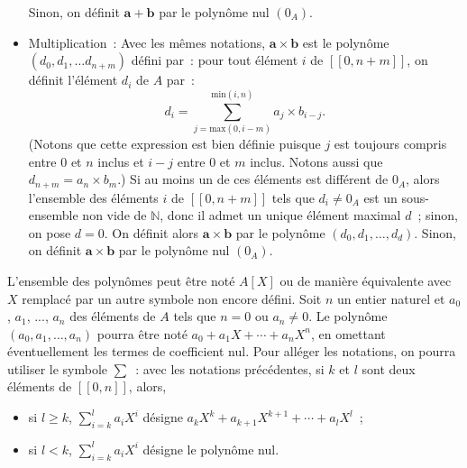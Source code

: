 \begin{itemize}[nosep]
            Sinon, on définit $\mathbf{a} + \mathbf{b}$ par le polynôme nul $(0_A)$.
        \item Multiplication : Avec les mêmes notations, $\mathbf{a} \times \mathbf{b}$ est le polynôme $(d_0, d_1, \dots d_{n+m})$ défini par : pour tout élément $i$ de $[\![0, n+m]\!]$, on définit l'élément $d_i$ de $A$ par :
            \begin{equation*}
                d_i = \sum_{j=\mathrm{max}(0,i-m)}^{\mathrm{min}(i,n)} a_j \times b_{i-j}.
            \end{equation*}
            (Notons que cette expression est bien définie puisque $j$ est toujours compris entre $0$ et $n$ inclus et $i-j$ entre $0$ et $m$ inclus.
            Notons aussi que $d_{n+m} = a_n \times b_m$.)
            Si au moins un de ces éléments est différent de $0_A$, alors l'ensemble des éléments $i$ de $[\![0, n+m]\!]$ tels que $d_i \neq 0_A$ est un sous-ensemble non vide de $\mathbb{N}$, donc il admet un unique élément maximal $d$ ; sinon, on pose $d = 0$.
            On définit alors $\mathbf{a} \times \mathbf{b}$ par le polynôme $(d_0, d_1, \dots, d_d)$.
            Sinon, on définit $\mathbf{a} \times \mathbf{b}$ par le polynôme nul $(0_A)$.
    \end{itemize}
    L'ensemble des polynômes peut être noté $A[X]$ ou de manière équivalente avec $X$ remplacé par un autre symbole non encore défini. 
    Soit $n$ un entier naturel et $a_0$, $a_1$, ..., $a_n$ des éléments de $A$ tels que $n = 0$ ou $a_n \neq 0$.
    Le polynôme $(a_0, a_1, \dots, a_n)$ pourra être noté $a_0 + a_1 X + \cdots + a_n X^n$, en omettant éventuellement les termes de coefficient nul.
    Pour alléger les notations, on pourra utiliser le symbole $\sum$ : avec les notations précédentes, si $k$ et $l$ sont deux éléments de $[\![0, n]\!]$, alors, 
    \begin{itemize}[nosep]
        \item si $l \geq k$, $\sum_{i=k}^l a_i X^i$ désigne $a_k X^k + a_{k+1} X^{k+1} + \cdots + a_l X^l$ ;
        \item si $l < k$, $\sum_{i=k}^l a_i X^i$ désigne le polynôme nul.
    \end{itemize}

\medskip

